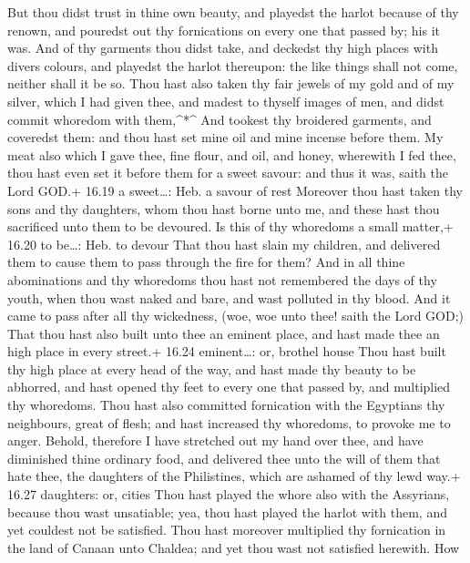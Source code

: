  But thou didst trust in thine own beauty, and playedst the
harlot because of thy renown, and pouredst out thy fornications on every
one that passed by; his it was.  And of thy garments thou
didst take, and deckedst thy high places with divers colours, and
playedst the harlot thereupon: the like things shall not come, neither
shall it be so.  Thou hast also taken thy fair jewels of my
gold and of my silver, which I had given thee, and madest to thyself
images of men, and didst commit whoredom with them,\^{}*\^{}
 And tookest thy broidered garments, and coveredst them:
and thou hast set mine oil and mine incense before them. 
My meat also which I gave thee, fine flour, and oil, and honey,
wherewith I fed thee, thou hast even set it before them for a sweet
savour: and thus it was, saith the Lord GOD.+ 16.19 a sweet\ldots: Heb.
a savour of rest  Moreover thou hast taken thy sons and thy
daughters, whom thou hast borne unto me, and these hast thou sacrificed
unto them to be devoured. Is this of thy whoredoms a small matter,+
16.20 to be\ldots: Heb. to devour  That thou hast slain my
children, and delivered them to cause them to pass through the fire for
them?  And in all thine abominations and thy whoredoms thou
hast not remembered the days of thy youth, when thou wast naked and
bare, and wast polluted in thy blood.  And it came to pass
after all thy wickedness, (woe, woe unto thee! saith the Lord GOD;)
 That thou hast also built unto thee an eminent place, and
hast made thee an high place in every street.+ 16.24 eminent\ldots: or,
brothel house  Thou hast built thy high place at every head
of the way, and hast made thy beauty to be abhorred, and hast opened thy
feet to every one that passed by, and multiplied thy whoredoms.
 Thou hast also committed fornication with the Egyptians
thy neighbours, great of flesh; and hast increased thy whoredoms, to
provoke me to anger.  Behold, therefore I have stretched
out my hand over thee, and have diminished thine ordinary food, and
delivered thee unto the will of them that hate thee, the daughters of
the Philistines, which are ashamed of thy lewd way.+ 16.27 daughters:
or, cities  Thou hast played the whore also with the
Assyrians, because thou wast unsatiable; yea, thou hast played the
harlot with them, and yet couldest not be satisfied.  Thou
hast moreover multiplied thy fornication in the land of Canaan unto
Chaldea; and yet thou wast not satisfied herewith.  How
